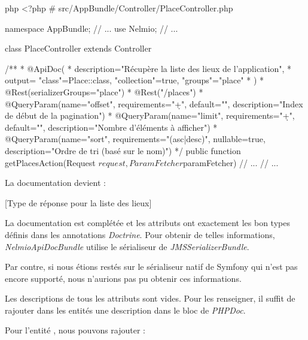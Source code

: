 \documentclass[big]{zmdocument}
\begin{document}
\begin{CodeBlock}{php}
<?php
# src/AppBundle/Controller/PlaceController.php

namespace AppBundle\Controller;
// ...
use Nelmio\ApiDocBundle\Annotation\ApiDoc;
// ...

class PlaceController extends Controller
{

    /**
     * @ApiDoc(
     *    description="Récupère la liste des lieux de l'application",
     *    output= { "class"=Place::class, "collection"=true, "groups"={"place"} }
     * )
     * @Rest\View(serializerGroups={"place"})
     * @Rest\Get("/places")
     * @QueryParam(name="offset", requirements="\d+", default="", description="Index de début de la pagination")
     * @QueryParam(name="limit", requirements="\d+", default="", description="Nombre d'éléments à afficher")
     * @QueryParam(name="sort", requirements="(asc|desc)", nullable=true, description="Ordre de tri (basé sur le nom)")
     */
    public function getPlacesAction(Request $request, ParamFetcher $paramFetcher)
    {
    // ...
    }
// ...
}
\end{CodeBlock}



La documentation devient :



[Type de réponse pour la liste des lieux]


La documentation est complétée et les attributs ont exactement les bon types définis dans les annotations \textit{Doctrine}. Pour obtenir de telles informations, \textit{NelmioApiDocBundle} utilise le sérialiseur de \textit{JMSSerializerBundle}.



\begin{Error}
Par contre, si nous étions restés sur le sérialiseur natif de Symfony qui n'est pas encore supporté, nous n'aurions pas pu obtenir ces informations.
\end{Error}


Les descriptions de tous les attributs sont vides. Pour les renseigner, il suffit de rajouter dans les entités une description dans le bloc de \textit{PHPDoc}.



Pour l'entité , nous pouvons rajouter :



\end{document}
